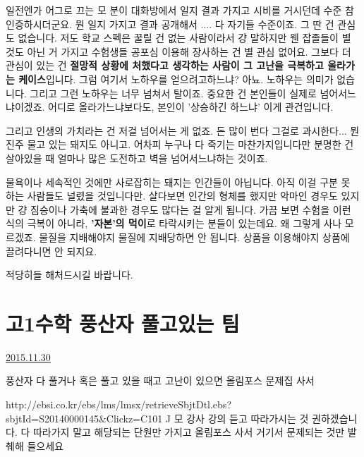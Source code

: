 일전엔가 어그로 끄는 모 분이 대화방에서 일지 결과 가지고 시비를 거시던데 수준 참 인증하시더군요.
뭔 일지 가지고 결과 공개해서 .... 다 자기들 수준이죠. 그 딴 건 관심도 없습니다.
저도 학교 스펙은 꿀릴 건 없는 사람이라서 걍 말하지만 웬 잡졸들이 별 것도 아닌 거 가지고 수험생들 공포심 이용해 장사하는 건 별 관심 없어요.
그보다 더 관심이 있는 건 \textbf{절망적 상황에 처했다고 생각하는 사람이 그 고난을 극복하고 올라가는 케이스}입니다.
그럼 여기서 노하우를 얻으려고하느냐? 아뇨. 노하우는 의미가 없습니다. 그리고 그런 노하우는 너무 넘쳐서 탈이죠.
중요한 건 본인들이 실제로 넘어서느냐이겠죠. 어디로 올라가느냐보다도, 본인이 '상승하긴 하느냐' 이게 관건입니다.
\vspace{5mm}

그리고 인생의 가치라는 건 저걸 넘어서는 게 없죠.
돈 많이 번다 그걸로 과시한다... 뭔 진주 물고 있는 돼지도 아니고.
어차피 누구나 다 죽기는 마찬가지입니다만 분명한 건 살아있을 때 얼마나 많은 도전하고 벽을 넘어서느냐하는 것이죠.
\vspace{5mm}

물욕이나 세속적인 것에만 사로잡히는 돼지는 인간들이 아닙니다. 아직 이걸 구분 못 하는 사람들도 널렸을 것입니다만.
살다보면 인간의 형체를 했지만 악마인 경우도 있지만 걍 짐승이나 가축에 불과한 경우도 많다는 걸 알게 됩니다.
가끔 보면 수험을 이런 식의 극복이 아니라, \textbf{'자본'의 먹이}로 타락시키는 분들이 있는데요.
왜 그렇게 사나 모르겠죠.
물질을 지배해야지 물질에 지배당하면 안 됩니다.
상품을 이용해야지 상품에 끌려다니면 안 되지요.
\vspace{5mm}

적당히들 해처드시길 바랍니다.
\vspace{5mm}






\section{고1수학 풍산자 풀고있는 팀}
\href{https://www.kockoc.com/Apoc/518860}{2015.11.30}

\vspace{5mm}

풍산자 다 풀거나 혹은 풀고 있을 때고 고난이 있으면
올림포스 문제집 사서
\vspace{5mm}

http://ebsi.co.kr/ebs/lms/lmsx/retrieveSbjtDtl.ebs?sbjtId=S20140000145&Clickz=C101
J 모 강사 강의 듣고 따라가시는 것 권하겠습니다.
다 따라가지 말고 해당되는 단원만 가지고 올림포스 사서 거기서 문제되는 것만 발췌해 들으세요
\vspace{5mm}

